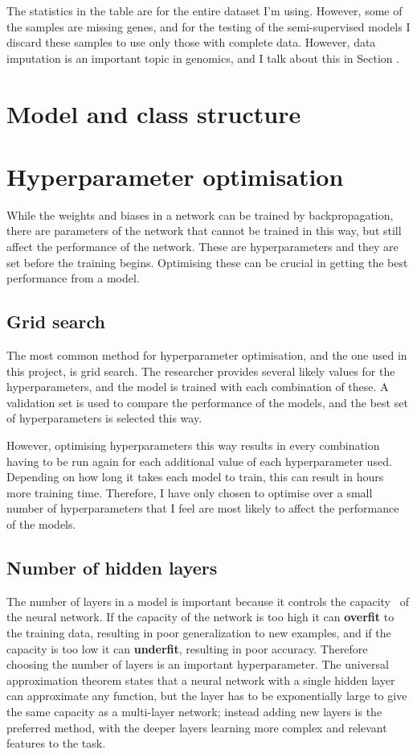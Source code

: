 \documentclass[12pt,a4paper,twoside,openright]{report}
\begin{document}
The statistics in the table are for the entire dataset I'm using. However, some of the samples are missing genes, and for the testing of the
semi-supervised models I discard these samples to use only those with complete data. However, data imputation is an important topic in 
genomics, and I talk about this in Section .

\section{Model and class structure}

\section{Hyperparameter optimisation}
While the weights and biases in a network can be trained by backpropagation, there are parameters of the network that cannot be trained in 
this way, but still affect the performance of the network. These are hyperparameters and they are set before the training begins. 
Optimising these can be crucial in getting the best performance from a model.

\subsection{Grid search}
The most common method for hyperparameter optimisation, and the one used in this project, is grid search. The researcher provides several 
likely values for the hyperparameters, and the model is trained with each combination of these. A validation set is used to compare the
performance of the models, and the best set of hyperparameters is selected this way.

However, optimising hyperparameters this way results in every combination having to be run again for each additional value of each
hyperparameter used. Depending on how long it takes each model to train, this can result in hours more training time. 
Therefore, I have only chosen to optimise over a small number of hyperparameters that I feel are most likely to affect the performance of the models.

\subsection{Number of hidden layers}
The number of layers in a model is important because it controls the capacity~\cite{Goodfellow-et-al-2016} of the neural network. If the 
capacity of the network is too high it can \textbf{overfit} to the training data, resulting in poor generalization to new examples, and if the capacity is 
too low it can \textbf{underfit}, resulting in poor accuracy. Therefore choosing the number of layers is an important hyperparameter.
The universal approximation theorem states that a neural network with a single hidden layer can approximate any function, but the layer 
has to be exponentially large to give the same capacity as a multi-layer network; instead adding new layers is the preferred method, 
with the deeper layers learning more complex and relevant features to the task.
\end{document}
